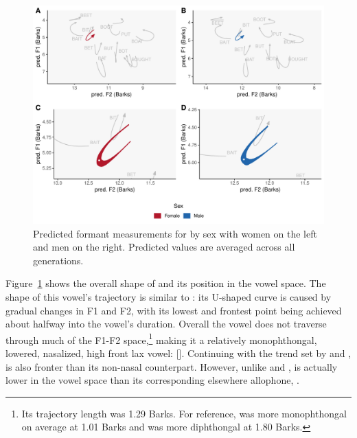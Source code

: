 \begin{figure}[tb!]
    \centering
    \includegraphics[width = 6.5in]{Figures/BIN/BIN_four_panel_plot_summarized.pdf}
    \caption[Predicted formant measurements for \bin by sex.]{Predicted formant measurements for \bin by sex with women on the left and men on the right. Predicted values are averaged across all generations.}
    \label{fig:BIN_four_panel_plot_summarized}
\end{figure}

Figure~\ref{fig:BIN_four_panel_plot_summarized} shows the overall shape of \bin and its position in the vowel space. The shape of this vowel's trajectory is similar to \ban: its U-shaped curve is caused by gradual changes in F1 and F2, with its lowest and frontest point being achieved about halfway into the vowel's duration. Overall the vowel does not traverse through much of the F1-F2 space,\footnote{Its trajectory length was 1.29 Barks. For reference, \ben was more monophthongal on average at 1.01 Barks and \ban was more diphthongal at 1.80 Barks.} making it a relatively monophthongal, lowered, nasalized, high front lax vowel: []. Continuing with the trend set by \ban and \ben, \bin is also fronter than its non-nasal counterpart. However, unlike \ban and \ben, \bin is actually lower in the vowel space than its corresponding elsewhere allophone, \bit.


